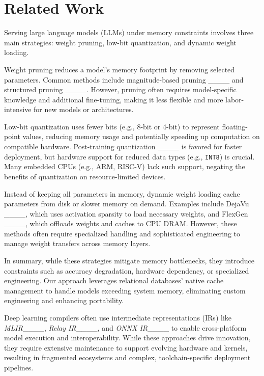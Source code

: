 \section{Related Work}

Serving large language models (LLMs) under memory constraints involves three main strategies: weight pruning, low-bit quantization, and dynamic weight loading. 

Weight pruning reduces a model's memory footprint by removing selected parameters. Common methods include magnitude-based pruning ____ and structured pruning ____. However, pruning often requires model-specific knowledge and additional fine-tuning, making it less flexible and more labor-intensive for new models or architectures.
    
Low-bit quantization uses fewer bits (e.g., 8-bit or 4-bit) to represent floating-point values, reducing memory usage and potentially speeding up computation on compatible hardware. Post-training quantization ____ is favored for faster deployment, but hardware support for reduced data types (e.g., \texttt{INT8}) is crucial. Many embedded CPUs (e.g., ARM, RISC-V) lack such support, negating the benefits of quantization on resource-limited devices.
    
Instead of keeping all parameters in memory, dynamic weight loading cache parameters from disk or slower memory on demand. Examples include DejaVu ____, which uses activation sparsity to load necessary weights, and FlexGen ____, which offloads weights and caches to CPU DRAM. However, these methods often require specialized handling and sophisticated engineering to manage weight transfers across memory layers.

In summary, while these strategies mitigate memory bottlenecks, they introduce constraints such as accuracy degradation, hardware dependency, or specialized engineering. Our approach leverages relational databases' native cache management to handle models exceeding system memory, eliminating custom engineering and enhancing portability.

Deep learning compilers often use intermediate representations (IRs) like \emph{MLIR}____, \emph{Relay IR}____, and \emph{ONNX IR}____ to enable cross-platform model execution and interoperability. While these approaches drive innovation, they require extensive maintenance to support evolving hardware and kernels, resulting in fragmented ecosystems and complex, toolchain-specific deployment pipelines.

